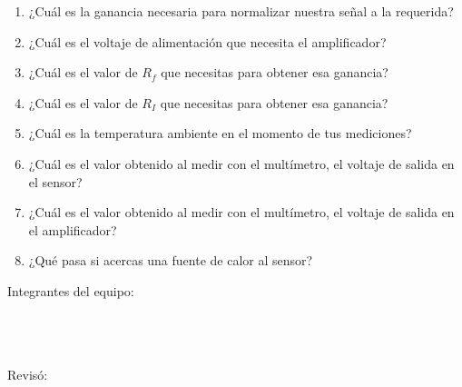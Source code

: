 	\begin{enumerate}
		\item ¿Cuál es la ganancia necesaria para normalizar nuestra señal a la requerida? \newline
		\item ¿Cuál es el voltaje de alimentación que necesita el amplificador? \newline
		\item ¿Cuál es el valor de $R_f$ que necesitas para obtener esa ganancia? \newline
		\item ¿Cuál es el valor de $R_I$ que necesitas para obtener esa ganancia? \newline
		\item ¿Cuál es la temperatura ambiente en el momento de tus mediciones? \newline
		\item ¿Cuál es el valor obtenido al medir con el multímetro, el voltaje de salida en el sensor? \newline
		\item ¿Cuál es el valor obtenido al medir con el multímetro, el voltaje de salida en el amplificador? \newline
		\item ¿Qué pasa si acercas una fuente de calor al sensor? \newline
	\end{enumerate}

	Integrantes del equipo: \\[0.2cm]
	\horrule{0.5pt} \\[0.2cm] %
	\horrule{0.5pt} \\[0.2cm] %
	\horrule{0.5pt} \\[0.2cm] %
	\horrule{0.5pt} %

	Revisó: \\[0.2cm]
	\horrule{0.5pt} \\%



